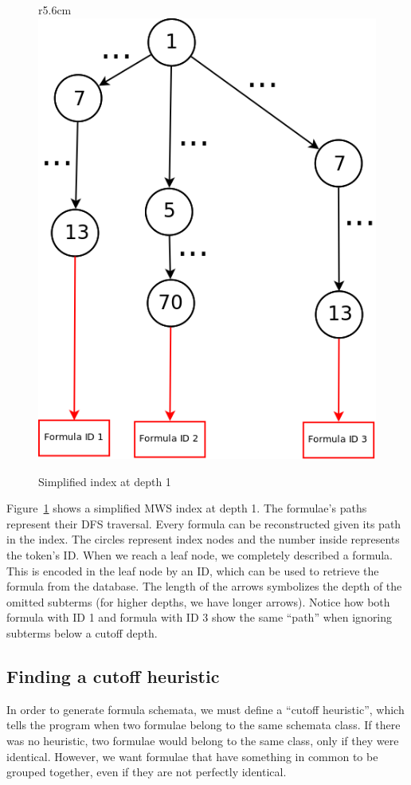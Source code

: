 \documentclass[a4paper,11pt,oneside]{article}
\def\MWS{\textsf{MWS}\xspace}
\begin{document}
\begin{figure}r{5.6cm}\vspace*{-1em}
    \includegraphics[scale=0.24]{img/FFG_Algo_diag.png}
\caption{Simplified index at depth 1}\label{fig:algoindex}
\end{figure}

Figure~\ref{fig:algoindex} shows a simplified \MWS index at depth 1.
The formulae's paths represent their DFS traversal.
Every formula can be reconstructed given its path in the index.
The circles represent index nodes and the number inside represents
the token's ID. When we reach a leaf node, we completely described a
formula. This is encoded in the leaf node by an ID, which can be used
to retrieve the formula from the database.
The length of the arrows symbolizes the depth of the omitted subterms
(for higher depths, we have longer arrows).
Notice how both formula with ID 1 and formula with ID 3 show the same
``path'' when ignoring subterms below a cutoff depth.

\subsection{Finding a cutoff heuristic}\label{subsec:cutoffheur}
In order to generate formula schemata, we must define a ``cutoff heuristic'',
which tells the program when two formulae belong to the same schemata class.
If there was no heuristic, two formulae would belong to the same class,
only if they were identical. However, we want formulae that have something in
common to be grouped together, even if they are not perfectly identical.
\end{document}
